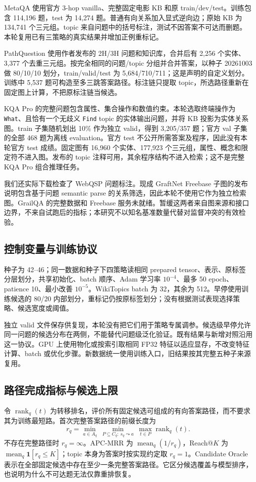 \documentclass[UTF8,a4paper,10pt,fontset=fandol]{ctexart}
\begin{document}
MetaQA 使用官方 3-hop vanilla、完整固定电影 KB 和原 train/dev/test\cite{metaqa}。训练包含 114,196 题，test 为 14,274 题。普通有向关系加入显式逆向边；原始 KB 为 134,741 个三元组。topic 来自问题中的括号标注，测试不因答案不可达而删题。本轮复用已有三策略的真实结果并增加正例重标记。

PathQuestion 使用作者发布的 2H/3H 问题和知识库\cite{pq}，合并后有 2,256 个实体、3,377 个去重三元组。按完全相同的问题/topic 分组并合并答案，以种子 20261003 做 80/10/10 划分，train/valid/test 为 5,684/710/711；这是声明的自定义划分。训练中 5,537 题可构造至多三跳答案路径。标注链只提取 topic，所选路径重新在固定图上计算，不把原标注链当候选。

KQA Pro 的完整问题包含属性、集合操作和数值约束\cite{kqa}。本轮选取终端操作为 \texttt{What}、且恰有一个无歧义 \texttt{Find} topic 的实体输出问题，并将 KB 投影为实体关系图。train 子集随机划出 10\% 作为独立 valid，得到 3,205/357 题；官方 val 子集的全部 468 题为离线 evaluation。官方 test 不公开所需答案及程序，因此没有本轮官方 test 成绩。固定图有 16,960 个实体、177,923 个三元组，属性、概念和限定符不进入图。发布的 topic 注释可用，其余程序结构不进入检索；这不是完整 KQA Pro 组合推理任务。

我们还实际下载检查了 WebQSP 问题标注。现成 GraftNet Freebase 子图的发布说明包含基于问题 semantic parse 的关系筛选，因此本轮不使用它作为独立检索图。GrailQA 的完整数据和 Freebase 服务未就绪。暂缓这两者来自图来源和接口边界，不来自试跑后的指标；本研究不以知名基准数量代替对监督冲突的有效检验。

\subsection{控制变量与训练协议}
种子为 42--46；同一数据和种子下四策略读相同 prepared tensor、表示、原标签分层划分，共享初始化、batch 顺序、Adam 学习率 $10^{-4}$、最多 50 epoch、patience 10、最小改善 $10^{-5}$。WikiTopics batch 为 32，其余为 512。早停使用训练候选的 80/20 内部划分，重标记仍按原标签划分；没有根据测试表现选择策略、候选宽度或阈值。

独立 valid 文件保存供复现，本轮没有把它们用于策略专属调参。候选级早停允许同一问题的候选分布在两侧，不能替代问题级泛化验证。既有结果与新增对照沿用这一协议。GPU 上使用物化或按索引取相同 FP32 特征以适应显存，不改变特征计算、batch 或优化步骤。新数据统一使用训练入口，旧结果按其完整五种子来源复用。

\subsection{路径完成指标与候选上限}
令 $\operatorname{rank}_q(t)$ 为转移排名，评价所有固定候选可组成的有向答案路径，而不要求其为训练最短路。首次完整答案路径的前缀长度为
\begin{equation}
r_q=\min_{a\in A_q}\ \min_{P\subseteq C_q:\ s_q\leadsto a}\ \max_{t\in P}\operatorname{rank}_q(t).
\end{equation}
不存在完整路径时 $r_q=\infty$。APC-MRR 为 $\operatorname{mean}_q(1/r_q)$，Reach@$K$ 为 $\operatorname{mean}_q\mathbf1[r_q\le K]$；topic 本身为答案时按实现约定取 $r_q=1$。Candidate Oracle 表示在全部固定候选中存在至少一条完整答案路径。它区分候选覆盖与模型排序，也说明为什么不可达题无法仅靠重排恢复。
\end{document}
